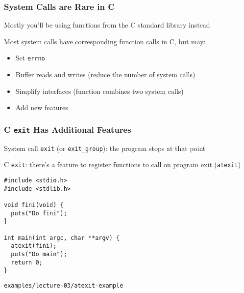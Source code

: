   \begin{frame}
    \frametitle{System Calls are Rare in C}

    Mostly you'll be using functions from the C standard library instead

    \vspace{2em}

    Most system calls have corresponding function calls in C, but may:
    \begin{itemize}
      \item Set \texttt{errno}
      \item Buffer reads and writes (reduce the number of system calls)
      \item Simplify interfaces (function combines two system calls)
      \item Add new features
    \end{itemize}
  \end{frame}

  \begin{frame}[fragile]
    \frametitle{C \texttt{exit} Has Additional Features}

    System call \texttt{exit} (or \texttt{exit\_group}): the program
    stops at that point

    \vspace{1em}

    C \texttt{exit}: there's a feature to register functions to call
    on program exit (\texttt{atexit})

    \vspace{1em}

    \begin{lstlisting}[xleftmargin=2em]
#include <stdio.h>
#include <stdlib.h>

void fini(void) {
  puts("Do fini");
}

int main(int argc, char **argv) {
  atexit(fini);
  puts("Do main");
  return 0;
}
    \end{lstlisting}
    \vspace{-1em}
    \begin{flushright}
      \lstinline|examples/lecture-03/atexit-example|
    \end{flushright}
  \end{frame}

